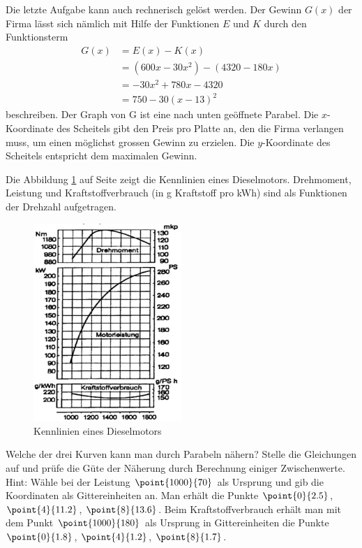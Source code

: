 \documentclass[%
11pt,%
twoside,%
titlepage,%
german,%
headsepline%
]{scrartcl}
\begin{document}
\begin{bem}
Die letzte Aufgabe kann auch rechnerisch gel\"ost werden. Der Gewinn $G(x)$ der Firma l\"asst sich n\"amlich mit Hilfe der Funktionen $E$ und $K$ durch den Funktionsterm
\begin{align*}
G(x) &=E(x) - K(x)\\
&=(600x-30x^2) - (4320 - 180x)\\
&=- 30x^2 + 780x - 4320\\
&=750 - 30(x - 13)^2
\end{align*}
beschreiben. Der Graph von G ist eine nach unten ge\"offnete Parabel. Die $x$-Koordinate des Scheitels gibt den Preis pro Platte an, den die Firma verlangen muss, um einen m\"oglichst grossen Gewinn zu erzielen. Die $y$-Koordinate des Scheitels entspricht dem maximalen Gewinn.
\end{bem}

\begin{ueb}[Leistung]
Die Abbildung \ref{abb:dieselmotor} auf Seite \pageref{abb:dieselmotor} zeigt die Kennlinien eines Dieselmotors. Drehmoment, Leistung und Kraftstoffverbrauch (in g Kraftstoff pro kWh) sind als Funktionen der Drehzahl aufgetragen.

\begin{figure}
\begin{center}
\includegraphics[width=0.5\textwidth,angle=-0.2]{pictures/motor}
\end{center}
\caption{Kennlinien eines Dieselmotors}\label{abb:dieselmotor}
\end{figure}
Welche der drei Kurven kann man durch Parabeln n\"ahern? Stelle die Gleichungen auf und pr\"ufe die G\"ute der N\"aherung durch Berechnung einiger Zwischenwerte.
Hint: W\"ahle bei der Leistung $\point{1000}{70}$ als Ursprung und gib die Koordinaten als Gittereinheiten an. Man erh\"alt die Punkte $\point{0}{2.5}$, $\point{4}{11.2}$, $\point{8}{13.6}$. Beim Kraftstoffverbrauch erh\"alt man mit dem Punkt $\point{1000}{180}$ als Ursprung in Gittereinheiten die Punkte $\point{0}{1.8}$, $\point{4}{1.2}$, $\point{8}{1.7}$.
\end{ueb}
\end{document}
